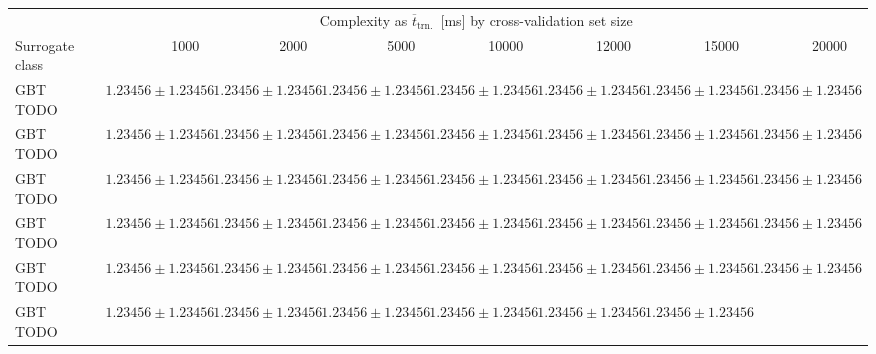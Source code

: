 \begin{table}[h]
	\centering
	{\footnotesize
		\begin{tabular}{lrrrrrrrr}
		\toprule
		{} & \multicolumn{7}{c}{Complexity as $\overline{t}_{\text{trn.}}$~[ms] by cross-validation set size}\\
		\cmidrule(lr){2-8}
		Surrogate class
						& \num{1000}
						& \num{2000}
						& \num{5000}
						& \num{10000}
						& \num{12000}
						& \num{15000}
						& \num{20000}\\
		\midrule
		GBT TODO
						& $\num{1.23456} \pm \num{1.23456}$
						& $\num{1.23456} \pm \num{1.23456}$
						& $\num{1.23456} \pm \num{1.23456}$
						& $\num{1.23456} \pm \num{1.23456}$
						& $\num{1.23456} \pm \num{1.23456}$
						& $\num{1.23456} \pm \num{1.23456}$
						& $\num{1.23456} \pm \num{1.23456}$
		\\
		GBT TODO
						& $\num{1.23456} \pm \num{1.23456}$
						& $\num{1.23456} \pm \num{1.23456}$
						& $\num{1.23456} \pm \num{1.23456}$
						& $\num{1.23456} \pm \num{1.23456}$
						& $\num{1.23456} \pm \num{1.23456}$
						& $\num{1.23456} \pm \num{1.23456}$
						& $\num{1.23456} \pm \num{1.23456}$
		\\
		GBT TODO
						& $\num{1.23456} \pm \num{1.23456}$
						& $\num{1.23456} \pm \num{1.23456}$
						& $\num{1.23456} \pm \num{1.23456}$
						& $\num{1.23456} \pm \num{1.23456}$
						& $\num{1.23456} \pm \num{1.23456}$
						& $\num{1.23456} \pm \num{1.23456}$
						& $\num{1.23456} \pm \num{1.23456}$
		\\
		GBT TODO
						& $\num{1.23456} \pm \num{1.23456}$
						& $\num{1.23456} \pm \num{1.23456}$
						& $\num{1.23456} \pm \num{1.23456}$
						& $\num{1.23456} \pm \num{1.23456}$
						& $\num{1.23456} \pm \num{1.23456}$
						& $\num{1.23456} \pm \num{1.23456}$
						& $\num{1.23456} \pm \num{1.23456}$
		\\
		GBT TODO
						& $\num{1.23456} \pm \num{1.23456}$
						& $\num{1.23456} \pm \num{1.23456}$
						& $\num{1.23456} \pm \num{1.23456}$
						& $\num{1.23456} \pm \num{1.23456}$
						& $\num{1.23456} \pm \num{1.23456}$
						& $\num{1.23456} \pm \num{1.23456}$
						& $\num{1.23456} \pm \num{1.23456}$
		\\
		GBT TODO
						& $\num{1.23456} \pm \num{1.23456}$
						& $\num{1.23456} \pm \num{1.23456}$
						& $\num{1.23456} \pm \num{1.23456}$
						& $\num{1.23456} \pm \num{1.23456}$
						& $\num{1.23456} \pm \num{1.23456}$
						& $\num{1.23456} \pm \num{1.23456}$

\end{tabular}}
\end{table}
